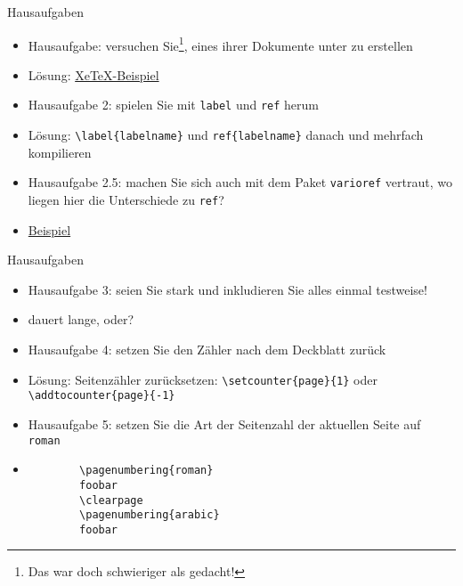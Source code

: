 \begin{frame}[fragile]{Hausaufgaben}

\begin{itemize}[<+->]
    \item Hausaufgabe: versuchen Sie\footnote{Das war doch schwieriger als gedacht!}, eines ihrer Dokumente unter \XeTeX zu erstellen
    \item Lösung: \href{}{XeTeX-Beispiel}
    \item Hausaufgabe 2: spielen Sie mit \lstinline|label| und \lstinline|ref| herum
    \item Lösung: \lstinline|\label{labelname}| und \lstinline|ref{labelname}| danach und mehrfach kompilieren
    \item Hausaufgabe 2.5: machen Sie sich auch mit dem Paket \lstinline|varioref| vertraut, wo liegen hier die Unterschiede zu \lstinline|ref|?
    \item \href{}{Beispiel}
\end{itemize}
    
\end{frame}

\begin{frame}[fragile]{Hausaufgaben}
    
    \begin{itemize}[<+->]
        \item Hausaufgabe 3: seien Sie stark und inkludieren Sie alles einmal testweise!
        \item dauert lange, oder?
        \item Hausaufgabe 4: setzen Sie den Zähler nach dem Deckblatt zurück
        \item Lösung: Seitenzähler zurücksetzen: \lstinline|\setcounter{page}{1}| oder \lstinline|\addtocounter{page}{-1}|
        \item Hausaufgabe 5: setzen Sie die Art der Seitenzahl der aktuellen Seite auf \texttt{roman}
        \item \begin{lstlisting}
        \pagenumbering{roman}
        foobar
        \clearpage
        \pagenumbering{arabic}
        foobar
        \end{lstlisting}
    \end{itemize}

\end{frame}

